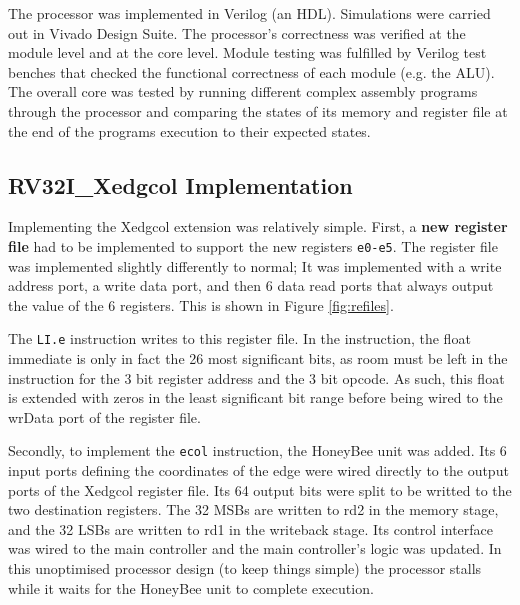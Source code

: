         The processor was implemented in Verilog (an \gls{HDL}). Simulations were carried out in Vivado Design Suite. The processor's  correctness was verified at the module level and at the core level. Module testing was fulfilled by Verilog test benches that checked the functional correctness of each module (e.g. the ALU). The overall core was tested by running different complex assembly programs through the processor and comparing the states of its memory and register file at the end of the programs execution to their expected states.

    \subsection{RV32I\_Xedgcol Implementation}
        

        Implementing the Xedgcol extension was relatively simple. First, a \textbf{new register file} had to be implemented to support the new registers \texttt{e0-e5}. The register file was implemented slightly differently to normal; It was implemented with a write address port, a write data port, and then 6 data read ports that always output the value of the 6 registers. This is shown in Figure \ref{fig:refiles}.

        
        
        The \texttt{LI.e} instruction writes to this register file. In the instruction, the float immediate is only in fact the 26 most significant bits, as room must be left in the instruction for the 3 bit register address and the 3 bit opcode. As such, this float is extended with zeros in the least significant bit range before being wired to the wrData port of the register file. 
        
        Secondly, to implement the \texttt{ecol} instruction, the HoneyBee unit was added. Its 6 input ports defining the coordinates of the edge were wired directly to the output ports of the Xedgcol register file. Its 64 output bits were split to be writted to the two destination registers. The 32 \glspl{MSB} are written to rd2 in the memory stage, and the 32 \glspl{LSB} are written to rd1 in the writeback stage. Its control interface was wired to the main controller and the main controller's logic was updated. In this unoptimised processor design (to keep things simple) the processor stalls while it waits for the HoneyBee unit to complete execution.

        


